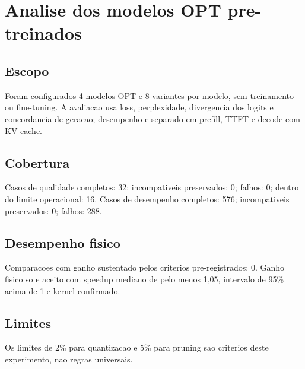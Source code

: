 \chapter{Analise dos modelos OPT pre-treinados}
\section{Escopo}
Foram configurados 4 modelos OPT e 8 variantes por modelo, sem treinamento ou fine-tuning.
A avaliacao usa loss, perplexidade, divergencia dos logits e concordancia de geracao; desempenho e separado em prefill, TTFT e decode com KV cache.
\section{Cobertura}
Casos de qualidade completos: 32; incompativeis preservados: 0; falhos: 0; dentro do limite operacional: 16.
Casos de desempenho completos: 576; incompativeis preservados: 0; falhos: 288.
\section{Desempenho fisico}
Comparacoes com ganho sustentado pelos criterios pre-registrados: 0.
Ganho fisico so e aceito com speedup mediano de pelo menos 1,05, intervalo de 95\% acima de 1 e kernel confirmado.
\section{Limites}
Os limites de 2\% para quantizacao e 5\% para pruning sao criterios deste experimento, nao regras universais.
